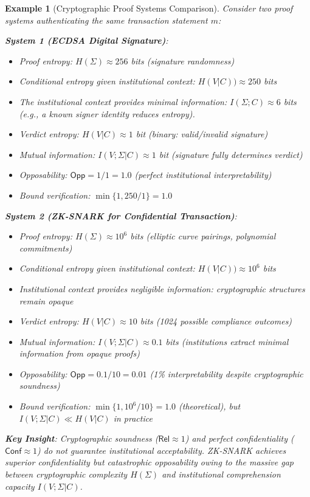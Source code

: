 \documentclass{ieeeaccess}
\newtheorem{example}{Example}[subsection]
\begin{document}
\begin{example}[Cryptographic Proof Systems Comparison]\label{ex:proof_comparison}
Consider two proof systems authenticating the same transaction statement $m$:

\textbf{System 1 (ECDSA Digital Signature)}:
\begin{itemize}
\item Proof entropy: $H(\Sigma) \approx 256$ bits (signature randomness)
\item Conditional entropy given institutional context: $H(V|C)) \approx 250$ bits
\item The institutional context provides minimal information: $I(\Sigma;C) \approx 6$ bits (e.g., a known signer identity reduces entropy).
\item Verdict entropy: $H(V|C) \approx 1$ bit (binary: valid/invalid signature)
\item Mutual information: $I(V;\Sigma|C) \approx 1$ bit (signature fully determines verdict)
\item Opposability: $\mathsf{Opp} = 1/1 = 1.0$ (perfect institutional interpretability)
\item Bound verification: $\min\{1, 250/1\} = 1.0$ \checkmark
\end{itemize}

\textbf{System 2 (ZK-SNARK for Confidential Transaction)}:
\begin{itemize}
\item Proof entropy: $H(\Sigma) \approx 10^6$ bits (elliptic curve pairings, polynomial commitments)
\item Conditional entropy given institutional context: $H(V|C)) \approx 10^6$ bits
\item Institutional context provides negligible information: cryptographic structures remain opaque
\item Verdict entropy: $H(V|C) \approx 10$ bits (1024 possible compliance outcomes)
\item Mutual information: $I(V;\Sigma|C) \approx 0.1$ bits (institutions extract minimal information from opaque proofs)
\item Opposability: $\mathsf{Opp} = 0.1/10 = 0.01$ (1\% interpretability despite cryptographic soundness)
\item Bound verification: $\min\{1, 10^6/10\} = 1.0$ (theoretical), but $I(V;\Sigma|C) \ll H(V|C)$ in practice
\end{itemize}

\textbf{Key Insight}: Cryptographic soundness ($\mathsf{Rel} \approx 1$) and perfect confidentiality ($\mathsf{Conf} \approx 1$) do not guarantee institutional acceptability. ZK-SNARK achieves superior confidentiality but catastrophic opposability owing to the massive gap between cryptographic complexity $H(\Sigma)$ and institutional comprehension capacity $I(V;\Sigma|C)$.
\end{example}
\end{document}
